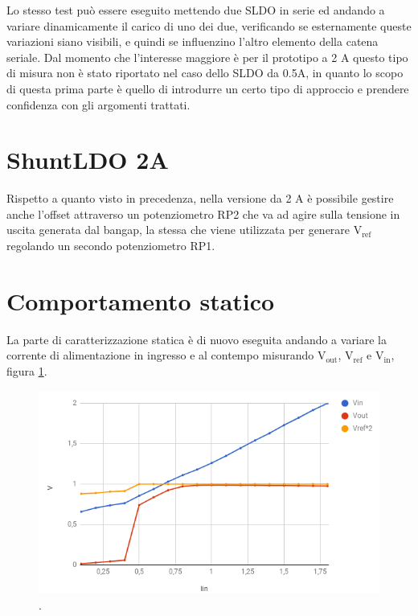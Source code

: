 Lo stesso test può essere eseguito mettendo due SLDO in serie ed andando a variare dinamicamente il carico di uno dei due, verificando se esternamente queste variazioni siano visibili, e quindi se influenzino l'altro elemento della catena seriale. 
Dal momento che l'interesse maggiore è per il prototipo a 2 A questo tipo di misura non è stato riportato nel caso dello SLDO da 0.5A, in quanto lo scopo di questa prima parte è quello di introdurre un certo tipo di approccio e  prendere confidenza con gli argomenti trattati.

\section{ShuntLDO 2A}
Rispetto a quanto visto in precedenza, nella versione da 2 A è possibile gestire anche l'offset attraverso un potenziometro RP2 che va ad agire sulla tensione in uscita generata dal bangap, la stessa che viene utilizzata per generare $\mathrm{V_{ref}}$ regolando un secondo potenziometro RP1. 

\section{Comportamento statico}
La parte di caratterizzazione statica è di nuovo eseguita andando a variare la corrente di alimentazione in ingresso e al contempo misurando $\mathrm{V_{out}}$, $\mathrm{V_{ref}}$ e $\mathrm{V_{in}}$, figura \ref{SLDO2Astatic}.

\begin{figure}
\centering
\includegraphics[scale=.5]{Immagini/SLDO2Astatic}
\caption{.}
\label{SLDO2Astatic}
\end{figure}

